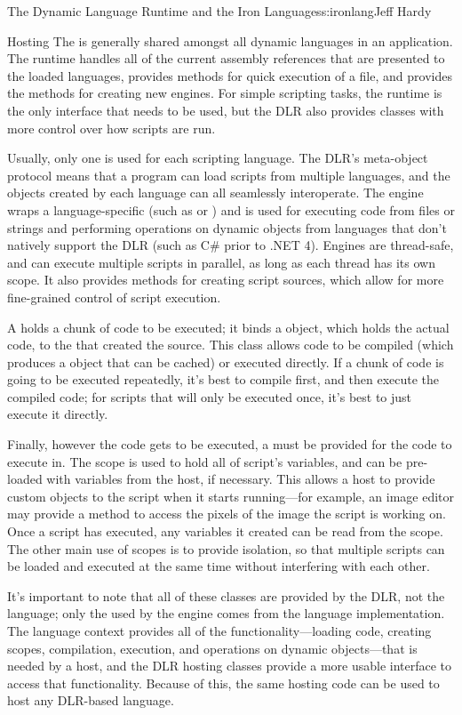 \begin{aosachapter}{The Dynamic Language Runtime and the Iron Languages}{s:ironlang}{Jeff Hardy}
\begin{aosasect1}{Hosting}
The  is generally shared amongst all dynamic languages in
an application. The runtime handles all of the current assembly references that
are presented to the loaded languages, provides methods for quick execution of
a file, and provides the methods for creating new engines. For simple scripting
tasks, the runtime is the only interface that needs to be used, but the DLR
also provides classes with more control over how scripts are run.

Usually, only one  is used for each scripting language. The
DLR's meta-object protocol means that a program can load scripts from multiple
languages, and the objects created by each language can all seamlessly
interoperate. The engine wraps a language-specific  (such
as  or ) and is used for executing code
from files or strings and performing operations on dynamic objects from
languages that don't natively support the DLR (such as C\# prior to .NET 4).
Engines are thread-safe, and can execute multiple scripts in parallel, as long as
each thread has its own scope. It also provides methods for creating script
sources, which allow for more fine-grained control of script execution. 

A  holds a chunk of code to be executed; it binds a
 object, which holds the actual code, to the
 that created the source. This class allows code to be
compiled (which produces a  object that can be cached) or
executed directly. If a chunk of code is going to be executed repeatedly, it's
best to compile first, and then execute the compiled code; for scripts that
will only be executed once, it's best to just execute it directly.

Finally, however the code gets to be executed, a  must be
provided for the code to execute in. The scope is used to hold all of script's
variables, and can be pre-loaded with variables from the host, if necessary.
This allows a host to provide custom objects to the script when it starts
running---for example, an image editor may provide a method to access the
pixels of the image the script is working on. Once a script has executed, any
variables it created can be read from the scope. The other main use of scopes is to
provide isolation, so that multiple scripts can be loaded and executed at the
same time without interfering with each other.

It's important to note that all of these classes are provided by the DLR, not
the language; only the  used by the engine comes from the
language implementation. The language context provides all of the
functionality---loading code, creating scopes, compilation, execution, and
operations on dynamic objects---that is needed by a host, and the DLR hosting
classes provide a more usable interface to access that functionality. Because
of this, the same hosting code can be used to host any DLR-based language.


\end{aosasect1}
\end{aosachapter}
